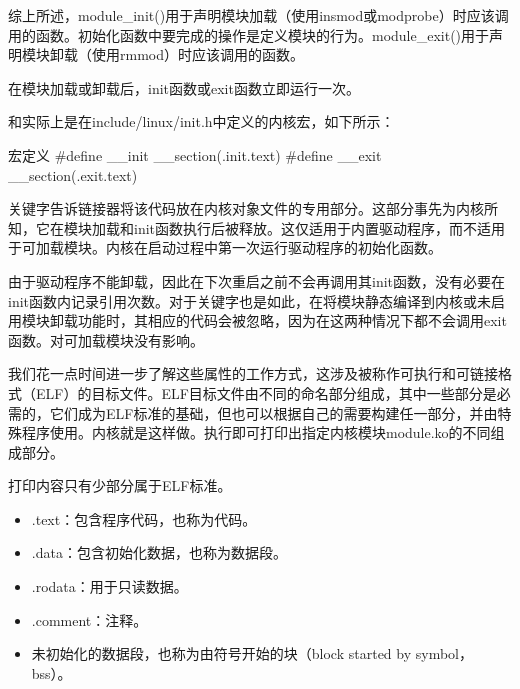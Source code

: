 \documentclass[lang=cn,newtx,10pt,scheme=chinese]{elegantbook}
\begin{document}
综上所述，module\_init()用于声明模块加载（使用insmod或modprobe）时应该调用的函数。初始化函数中要完成的操作是定义模块的行为。module\_exit()用于声明模块卸载（使用rmmod）时应该调用的函数。

\begin{marker}
在模块加载或卸载后，init函数或exit函数立即运行一次。
\end{marker}


和实际上是在include/linux/init.h中定义的内核宏，如下所示：

\begin{mycode}{宏定义}
#define __init __section(.init.text)
#define __exit __section(.exit.text)
\end{mycode}

关键字告诉链接器将该代码放在内核对象文件的专用部分。这部分事先为内核所知，它在模块加载和init函数执行后被释放。这仅适用于内置驱动程序，而不适用于可加载模块。内核在启动过程中第一次运行驱动程序的初始化函数。

由于驱动程序不能卸载，因此在下次重启之前不会再调用其init函数，没有必要在init函数内记录引用次数。对于关键字也是如此，在将模块静态编译到内核或未启用模块卸载功能时，其相应的代码会被忽略，因为在这两种情况下都不会调用exit函数。对可加载模块没有影响。

我们花一点时间进一步了解这些属性的工作方式，这涉及被称作可执行和可链接格式（ELF）的目标文件。ELF目标文件由不同的命名部分组成，其中一些部分是必需的，它们成为ELF标准的基础，但也可以根据自己的需要构建任一部分，并由特殊程序使用。内核就是这样做。执行即可打印出指定内核模块module.ko的不同组成部分。

打印内容只有少部分属于ELF标准。

\begin{itemize}
\item .text：包含程序代码，也称为代码。
\item .data：包含初始化数据，也称为数据段。
\item .rodata：用于只读数据。
\item .comment：注释。
\item 未初始化的数据段，也称为由符号开始的块（block started by symbol，bss）。
\end{itemize}
\end{document}
